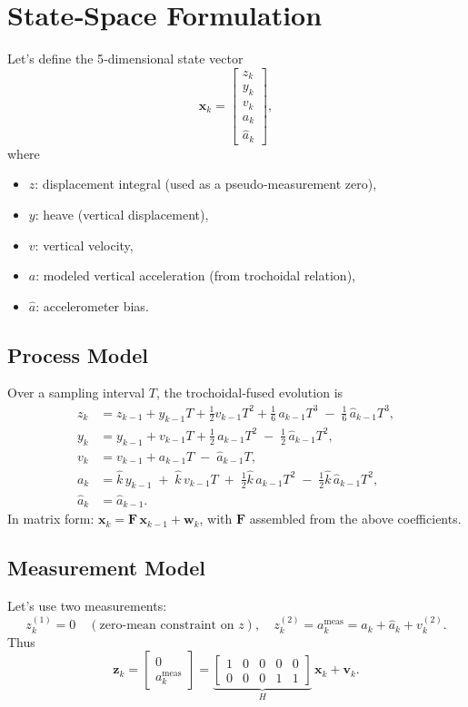 \documentclass[11pt,letterpaper]{article}
\begin{document}
\section{State‐Space Formulation}
Let's define the 5‐dimensional state vector
\[
\mathbf{x}_k = 
\begin{bmatrix}
z_k \\ y_k \\ v_k \\ a_k \\ \hat a_k
\end{bmatrix},
\]
where
\begin{itemize}
  \item \(z\): displacement integral (used as a pseudo‐measurement zero),
  \item \(y\): heave (vertical displacement),
  \item \(v\): vertical velocity,
  \item \(a\): modeled vertical acceleration (from trochoidal relation),
  \item \(\hat a\): accelerometer bias.
\end{itemize}

\subsection{Process Model}
Over a sampling interval \(T\), the trochoidal‐fused evolution is
\[
\begin{aligned}
z_k &= z_{k-1} + y_{k-1}T + \tfrac12v_{k-1}T^2 + \tfrac16\,a_{k-1}T^3 \;-\;\tfrac16\,\hat a_{k-1}T^3,\\
y_k &= y_{k-1} + v_{k-1}T + \tfrac12\,a_{k-1}T^2 \;-\;\tfrac12\,\hat a_{k-1}T^2,\\
v_k &= v_{k-1} + a_{k-1}T \;-\;\hat a_{k-1}T,\\
a_k &= \hat{k}\,y_{k-1} \;+\;\hat{k}\,v_{k-1}T \;+\;\tfrac12\hat{k}\,a_{k-1}T^2 \;-\;\tfrac12\hat{k}\,\hat a_{k-1}T^2,\\
\hat a_k &= \hat a_{k-1}.
\end{aligned}
\]
In matrix form: \(\mathbf{x}_k = \mathbf{F}\,\mathbf{x}_{k-1} + \mathbf{w}_k\), with \(\mathbf{F}\) assembled from the above coefficients.

\subsection{Measurement Model}
Let's use two measurements:
\[
z^{(1)}_k = 0 \quad(\text{zero‐mean constraint on }z), 
\quad
z^{(2)}_k = a^{\mathrm{meas}}_k = a_k + \hat a_k + v^{(2)}_k.
\]
Thus
\[
\mathbf{z}_k = 
\begin{bmatrix}0 \\ a^{\mathrm{meas}}_k\end{bmatrix}
= 
\underbrace{\begin{bmatrix}1&0&0&0&0\\0&0&0&1&1\end{bmatrix}}_{\!H\!}
\,\mathbf{x}_k + \mathbf{v}_k.
\]
\end{document}
